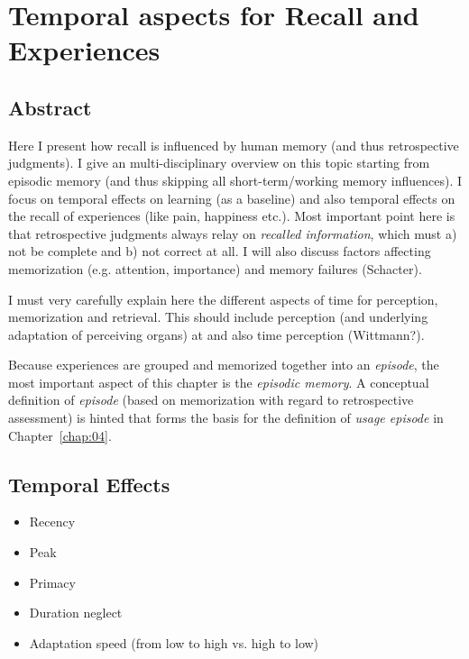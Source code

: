 \chapter{Temporal aspects for Recall and Experiences}\label{chap:03}
\section*{Abstract}
Here I present how recall is influenced by human memory (and thus retrospective judgments).
I give an multi-disciplinary overview on this topic starting from episodic memory (and thus skipping all short-term/working memory influences).
I focus on temporal effects on learning (as a baseline) and also temporal effects on the recall of experiences (like pain, happiness etc.).
Most important point here is that retrospective judgments always relay on \textit{recalled information}, which must a) not be complete and b) not correct at all.
I will also discuss factors affecting memorization (e.g. attention, importance) and memory failures (Schacter).

I must very carefully explain here the different aspects of time for perception, memorization and retrieval.
This should include perception (and underlying adaptation of perceiving organs) at and also time perception (Wittmann?).


Because experiences are grouped and memorized together into an \textit{episode}, the most important aspect of this chapter is the \textit{episodic memory}.
A conceptual definition of \emph{episode} (based on memorization with regard to retrospective assessment) is hinted that forms the basis for the definition of \textit{usage episode} in Chapter~\ref{chap:04}.

\section{Temporal Effects}
\begin{itemize}
\item Recency
\item Peak
\item Primacy
\item Duration neglect
\item Adaptation speed (from low to high vs. high to low)
\end{itemize}

